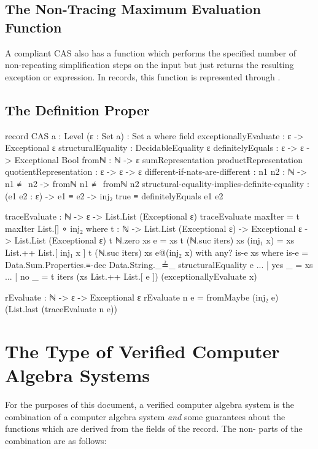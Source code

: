 \documentclass{report}
\begin{document}
\subsection{The Non-Tracing Maximum Evaluation Function}
A compliant CAS also has a function which performs the specified number of non-repeating simplification steps on the input but just returns the resulting exception or expression.  In  records, this function is represented through .

\subsection{The Definition Proper}

\begin{code}
record CAS {a : Level} (ε : Set a) : Set a where
  field
    exceptionallyEvaluate : ε -> Exceptional ε
    structuralEquality : DecidableEquality ε
    definitelyEquals : ε -> ε -> Exceptional Bool
    fromℕ : ℕ -> ε
    sumRepresentation
     productRepresentation
     quotientRepresentation : ε -> ε -> ε
    different-if-nats-are-different :
      {n1 n2 : ℕ} -> n1 ≢ n2 -> fromℕ n1 ≢ fromℕ n2
    structural-equality-implies-definite-equality :
      (e1 e2 : ε) -> e1 ≡ e2 -> inj₂ true ≡ definitelyEquals e1 e2

  traceEvaluate : ℕ -> ε -> List.List (Exceptional ε)
  traceEvaluate maxIter = t maxIter List.[] ∘ inj₂
    where
    t : ℕ -> List.List (Exceptional ε) -> Exceptional ε -> List.List (Exceptional ε)
    t ℕ.zero xs e = xs
    t (ℕ.suc iters) xs (inj₁ x) = xs List.++ List.[ inj₁ x ]
    t (ℕ.suc iters) xs e@(inj₂ x) with any? is-e xs
      where is-e = Data.Sum.Properties.≡-dec Data.String._≟_ structuralEquality e
    ... | yes _ = xs
    ... | no _ = t iters (xs List.++ List.[ e ]) (exceptionallyEvaluate x)

  rEvaluate : ℕ -> ε -> Exceptional ε
  rEvaluate n e = fromMaybe (inj₂ e) (List.last (traceEvaluate n e))
\end{code}

\section{The Type of Verified Computer Algebra Systems}
For the purposes of this document, a verified computer algebra system is the combination of a  computer algebra system \emph{and} some guarantees about the functions which are derived from the fields of the  record.  The non- parts of the combination are as follows:
\end{document}
